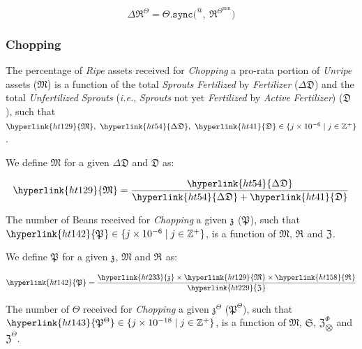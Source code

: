 \documentclass[tikz]{article}
\newcommand{\code}[1]{\texttt{#1}}
\newcommand{\term}[1]{\textsl{#1}}
\newcommand{\Beanstalk}{} %
\newcommand{\bean}{} %
\begin{document}
    $$
        \Delta \mathfrak{R}^{\Theta} =
            \Theta \code{.sync(}\Beanstalk^{@},\ 
                \mathfrak{R}^{{\Theta}^{\text{min}}}
            \code{)}
    $$

\subsubsection{Chopping}

The percentage of \term{Ripe} assets received for \term{Chopping} a pro-rata portion of \term{Unripe} assets (\hyperlink{ht129}{$\mathfrak{M}$}) is a function of the total \term{Sprouts} \term{Fertilized} by \term{Fertilizer} (\hyperlink{ht54}{$\Delta \mathfrak{D}$}) and the total \term{Unfertilized} \term{Sprouts} (\term{i.e.}, \term{Sprouts} not yet \term{Fertilized} by \term{Active} \term{Fertilizer}) (\hyperlink{ht41}{$\mathfrak{D}$}), such that $\hyperlink{ht129}{\mathfrak{M}},\ \hyperlink{ht54}{\Delta \mathfrak{D}},\ \hyperlink{ht41}{\mathfrak{D}} \in \{j \times 10^{-6} \mid j \in \mathbb{Z}^{+} \}$.

We define \hyperlink{ht129}{$\mathfrak{M}$} for a given \hyperlink{ht54}{$\Delta \mathfrak{D}$} and \hyperlink{ht41}{$\mathfrak{D}$} as: 

    $$
        \hyperlink{ht129}{\mathfrak{M}} = 
            \frac{\hyperlink{ht54}{\Delta \mathfrak{D}}}{\hyperlink{ht54}
                {\Delta \mathfrak{D}} + \hyperlink{ht41}{\mathfrak{D}}}
    $$

The number of Beans received for \term{Chopping} a given \hyperlink{ht233}{$\mathfrak{z}^{\bean}$} (\hyperlink{ht142}{$\mathfrak{P}^{\bean}$}), such that $\hyperlink{ht142}{\mathfrak{P}^{\bean}} \in \{j \times 10^{-6} \mid j \in \mathbb{Z}^{+} \}$, is a function of \hyperlink{ht129}{$\mathfrak{M}$}, \hyperlink{ht158}{$\mathfrak{R}^{\bean}$} and \hyperlink{ht229}{$\mathfrak{Z}^{\bean}$}.

We define \hyperlink{ht142}{$\mathfrak{P}^{\bean}$} for a given \hyperlink{ht233}{$\mathfrak{z}^{\bean}$}, \hyperlink{ht129}{$\mathfrak{M}$} and \hyperlink{ht158}{$\mathfrak{R}^{\bean}$} as:

    $$
        \hyperlink{ht142}{\mathfrak{P}^{\bean}} = 
            \frac{\hyperlink{ht233}{\mathfrak{z}^{\bean}} \times 
                    \hyperlink{ht129}{\mathfrak{M}} \times 
                    \hyperlink{ht158}{\mathfrak{R}^{\bean}}}{\hyperlink{ht229}
                {\mathfrak{Z}^{\bean}}}
    $$

The number of $\Theta$ received for \term{Chopping} a given $\mathfrak{z}^{\Theta}$ (\hyperlink{ht143}{$\mathfrak{P}^{\Theta}$}), such that $\hyperlink{ht143}{\mathfrak{P}^{\Theta}} \in \{j \times 10^{-18} \mid j \in \mathbb{Z}^{+} \}$, is a function of \hyperlink{ht129}{$\mathfrak{M}$}, \hyperlink{ht174}{$\mathfrak{S}$}, \hyperlink{ht232}{$\mathfrak{Z}_{\bigotimes}^{\Phi}$} and $\mathfrak{Z}^{\Theta}$.
\end{document}
